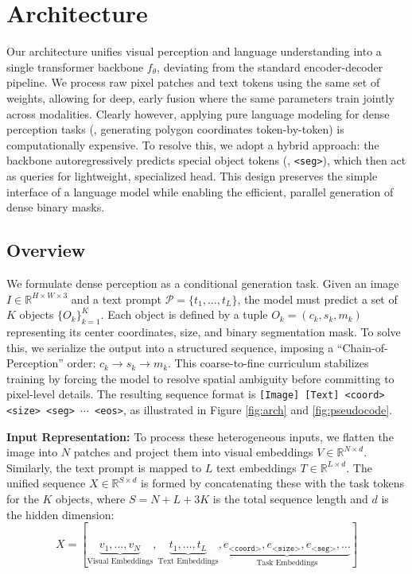 
\section{Architecture}
\label{sec:architecture}

Our architecture unifies visual perception and language understanding into a single transformer backbone $f_\theta$, deviating from the standard encoder-decoder pipeline. We process raw pixel patches and text tokens using the same set of weights, allowing for deep, early fusion where the same parameters train jointly across modalities. Clearly however, applying pure language modeling for dense perception tasks (\eg, generating polygon coordinates token-by-token) is computationally expensive. To resolve this, we adopt a hybrid approach: the backbone autoregressively predicts special object tokens (\eg, \texttt{<seg>}), which then act as queries for lightweight, specialized head. This design preserves the simple interface of a language model while enabling the efficient, parallel generation of dense binary masks.


\subsection{Overview}



\noindent We formulate dense perception as a conditional generation task. Given an image $I \in \mathbb{R}^{H \times W \times 3}$ and a text prompt $\mathcal{P} = \{t_1, \dots, t_L\}$, the model must predict a set of $K$ objects $\{O_k\}_{k=1}^K$. Each object is defined by a tuple $O_k = (c_k, s_k, m_k)$ representing its center coordinates, size, and binary segmentation mask. To solve this, we serialize the output into a structured sequence, imposing a ``Chain-of-Perception'' order: $c_k \rightarrow s_k \rightarrow m_k$. This coarse-to-fine curriculum stabilizes training by forcing the model to resolve spatial ambiguity before committing to pixel-level details. The resulting sequence format is \texttt{[Image] [Text] <coord> <size> <seg> $\cdots$ <eos>}, as illustrated in Figure \ref{fig:arch} and \ref{fig:pseudocode}.


\noindent \textbf{Input Representation:} To process these heterogeneous inputs, we flatten the image into $N$ patches and project them into visual embeddings $V \in \mathbb{R}^{N \times d}$. Similarly, the text prompt is mapped to $L$ text embeddings $T \in \mathbb{R}^{L \times d}$. The unified sequence $X \in \mathbb{R}^{S \times d}$ is formed by concatenating these with the task tokens for the $K$ objects, where $S = N + L + 3K$ is the total sequence length and $d$ is the hidden dimension:
\begin{equation}
X = [\underbrace{v_1, \dots, v_N}_{\text{Visual Embeddings}}, \underbrace{t_1, \dots, t_L}_{\text{Text Embeddings}}, \underbrace{e_{\texttt{<coord>}}, e_{\texttt{<size>}}, e_{\texttt{<seg>}}, \dots}_{\text{Task Embeddings}}]
\end{equation}

